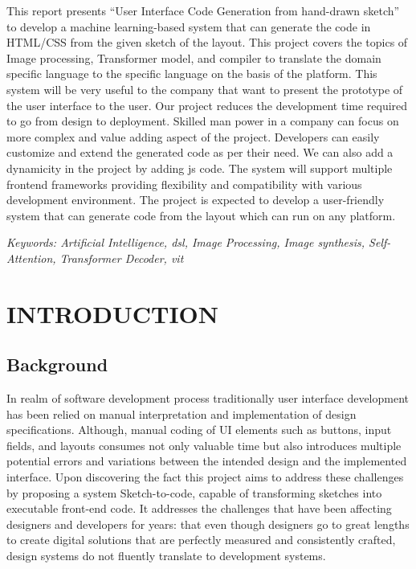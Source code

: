 \documentclass{ioereport}
\begin{document}
This report presents “User Interface Code Generation from hand-drawn sketch” to
develop a machine learning-based system that can generate the code in HTML/CSS
from the given sketch of the layout. This project covers the topics of Image processing,
Transformer model, and compiler to translate the domain specific language to the
specific language on the basis of the platform. This system will be very useful to the
company that want to present the prototype of the user interface to the user. Our project
reduces the development time required to go from design to deployment. Skilled man
power in a company can focus on more complex and value adding aspect of the project.
Developers can easily customize and extend the generated code as per their need. We
can also add a dynamicity in the project by adding \gls{js} code. The system will
support multiple frontend frameworks providing flexibility and compatibility with
various development environment. The project is expected to develop a user-friendly
system that can generate code from the layout which can run on any platform.
    
    \textit{Keywords: Artificial Intelligence, \gls{dsl}, Image
Processing, Image synthesis, Self-Attention, Transformer Decoder, \gls{vit}}

    \pagebreak
    

\tableofcontents
\pagebreak

\listoffigures
\pagebreak

\listoftables
\pagebreak
  
\printglossary[type=\acronymtype,style=acronyms-only,title=List of Abbreviations{\vspace{0.5\baselineskip}}]
\pagebreak


\mainsection

\section{\MakeUppercase{Introduction}}

    \subsection{Background}
In realm of software development process traditionally user interface development has
been relied on manual interpretation and implementation of design specifications.
Although, manual coding of UI elements such as buttons, input fields, and layouts
consumes not only valuable time but also introduces multiple potential errors and
variations between the intended design and the implemented interface. Upon
discovering the fact this project aims to address these challenges by proposing a system
Sketch-to-code, capable of transforming sketches into executable front-end code. It
addresses the challenges that have been affecting designers and developers for years:
that even though designers go to great lengths to create digital solutions that are
perfectly measured and consistently crafted, design systems do not fluently translate to
development systems.
\end{document}
